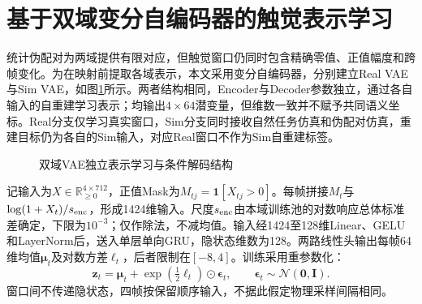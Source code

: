 \section{基于双域变分自编码器的触觉表示学习}
\label{sec:ch05_dual_vae_representation}

统计伪配对为两域提供有限对应，但触觉窗口仍同时包含精确零值、正值幅度和跨帧变化。为在映射前提取各域表示，本文采用变分自编码器\cite{kingma2014vae}，分别建立Real VAE与Sim VAE，如图\ref{fig:ch05_dual_vae}所示。两者结构相同，Encoder与Decoder参数独立，通过各自输入的自重建学习表示；均输出$4\times64$潜变量，但维数一致并不赋予共同语义坐标。Real分支仅学习真实窗口，Sim分支同时接收自然任务仿真和伪配对仿真，重建目标仍为各自的Sim输入，对应Real窗口不作为Sim自重建标签。

\begin{figure}[htbp]
 \centering
 \caption{双域VAE独立表示学习与条件解码结构}
 \label{fig:ch05_dual_vae}
\end{figure}

记输入为$X\in\mathbb R_{\ge0}^{4\times712}$，正值Mask为$M_{tj}=\mathbf1[X_{tj}>0]$。每帧拼接$M_t$与$\log(1+X_t)/s_{\rm enc}$，形成1424维输入。尺度$s_{\rm enc}$由本域训练池的对数响应总体标准差确定，下限为$10^{-3}$；仅作除法，不减均值。输入经1424至128维Linear、GELU和LayerNorm后，送入单层单向GRU，隐状态维数为128。两路线性头输出每帧64维均值$\boldsymbol\mu_t$及对数方差$\boldsymbol\ell_t$，后者限制在$[-8,4]$。训练采用重参数化：
\begin{equation}
 \boldsymbol z_t=\boldsymbol\mu_t+
 \exp\!\left(\tfrac12\boldsymbol\ell_t\right)\odot\boldsymbol\epsilon_t,
 \qquad \boldsymbol\epsilon_t\sim\mathcal N(\boldsymbol0,\boldsymbol I).
 \label{eq:ch05_vae_reparameterization}
\end{equation}
窗口间不传递隐状态，四帧按保留顺序输入，不据此假定物理采样间隔相同。

